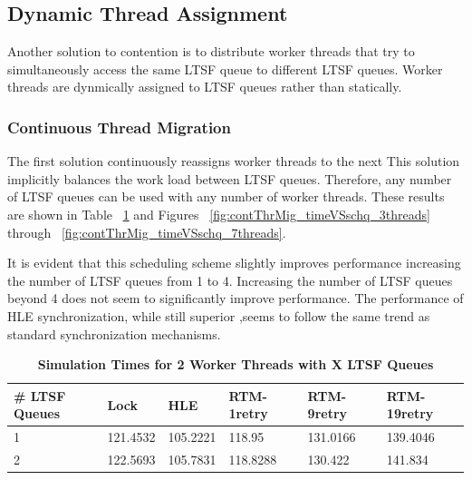 \documentclass[11pt]{book}
\begin{document}
\subsection{Dynamic Thread Assignment}

Another solution to contention is to distribute worker threads that try to
simultaneously access the same LTSF queue to different LTSF queues.  Worker
threads are dynmically assigned to LTSF queues rather than statically.  

\subsubsection{Continuous Thread Migration}

The first solution continuously reassigns worker threads to the next  
This solution implicitly balances the work load between LTSF queues.  Therefore,
any number of LTSF queues can be used with any number of worker threads.  These
results are shown in Table ~\ref{tab:contThrMig_2threadsXschq} and Figures
~\ref{fig:contThrMig_timeVSschq_3threads} through
~\ref{fig:contThrMig_timeVSschq_7threads}. 

It is evident that this scheduling scheme slightly improves performance
increasing the number of LTSF queues from 1 to 4.  Increasing the number of LTSF
queues beyond 4 does not seem to significantly improve performance.  The
performance of HLE synchronization, while still superior ,seems to follow the
same trend as standard synchronization mechanisms.

\begin{table}[H]
    \centering
    \begin{tabular}{l|p{2cm}|p{2cm}|p{2cm}|p{2cm}|p{2cm}}
        \textbf{\# LTSF Queues}&Lock &HLE &RTM-1retry &RTM-9retry &RTM-19retry \\
        \hline
        \midrule
            1 &121.4532  &105.2221 &118.95   &131.0166 &139.4046 \\ 
            2 &122.5693  &105.7831 &118.8288 &130.422  &141.834  \\
    \end{tabular}
    \caption{\textbf{Simulation Times for 2 Worker Threads with X LTSF
        Queues}}\label{tab:contThrMig_2threadsXschq}
\end{table}
\end{document}
